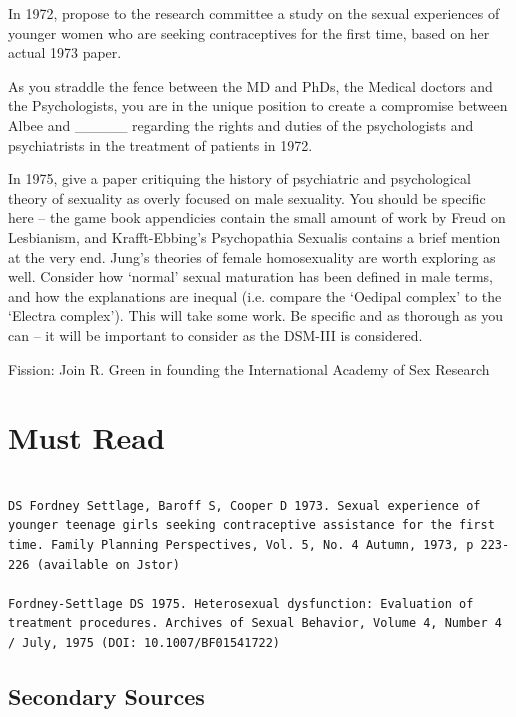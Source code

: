 In 1972, propose to the research committee a study on the sexual experiences of younger women who are seeking contraceptives for the first time, based on her actual 1973 paper. 

As you straddle the fence between the MD and PhDs, the Medical doctors and the Psychologists, you are in the unique position to create a compromise between Albee and \_\_\_\_\_ regarding the rights and duties of the psychologists and psychiatrists in the treatment of patients in 1972.

In 1975, give a paper critiquing the history of psychiatric and psychological theory of sexuality as overly focused on male sexuality. You should be specific here – the game book appendicies contain the small amount of work by Freud on Lesbianism, and Krafft-Ebbing's Psychopathia Sexualis contains a brief mention at the very end. Jung's theories of female homosexuality are worth exploring as well. Consider how `normal' sexual maturation has been defined in male terms, and how the explanations are inequal (i.e. compare the `Oedipal complex' to the `Electra complex'). This will take some work. Be specific and as thorough as you can – it will be important to consider as the DSM-III is considered.

Fission: Join R. Green in founding the International Academy of Sex Research

\section{Must Read}
\label{mustread}

\begin{adjustwidth}{2.5em}{2.5em}
\begin{verbatim}

DS Fordney Settlage, Baroff S, Cooper D 1973. Sexual experience of younger teenage girls seeking contraceptive assistance for the first time. Family Planning Perspectives, Vol. 5, No. 4 Autumn, 1973, p 223-226 (available on Jstor)

Fordney-Settlage DS 1975. Heterosexual dysfunction: Evaluation of treatment procedures. Archives of Sexual Behavior, Volume 4, Number 4 / July, 1975 (DOI: 10.1007/BF01541722)

\end{verbatim}
\end{adjustwidth}

\subsection{Secondary Sources}
\label{secondarysources}

